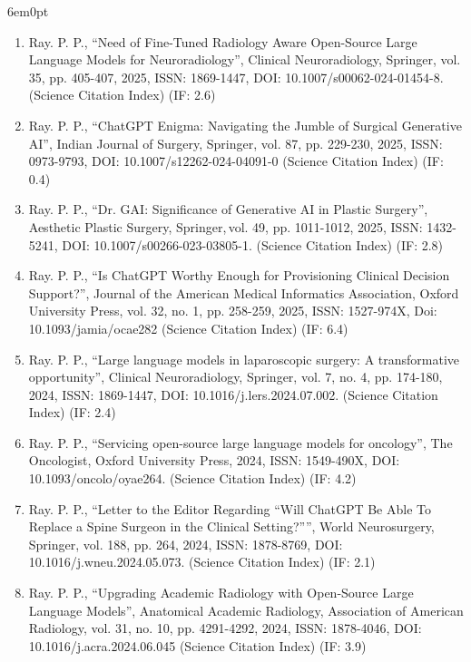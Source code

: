 \documentclass[11pt,a4paper]{moderncv}
\begin{document}
\begin{adjustwidth}{6em}{0pt}
\begin{enumerate}
		\item Ray. P. P., “Need of Fine-Tuned Radiology Aware Open-Source Large Language Models for Neuroradiology”, Clinical Neuroradiology, Springer, vol. 35, pp. 405-407, 2025, ISSN: 1869-1447, DOI: 10.1007/s00062-024-01454-8. (Science Citation Index) (IF: 2.6)
		
		\item Ray. P. P., “ChatGPT Enigma: Navigating the Jumble of Surgical Generative AI”, Indian Journal of Surgery, Springer, vol. 87, pp. 229-230, 2025, ISSN: 0973-9793, DOI: 10.1007/s12262-024-04091-0 (Science Citation Index) (IF: 0.4)
		
		\item Ray. P. P., “Dr. GAI: Significance of Generative AI in Plastic Surgery”, Aesthetic Plastic Surgery, Springer, vol. 49, pp. 1011-1012, 2025, ISSN: 1432-5241, DOI: 10.1007/s00266-023-03805-1. (Science Citation Index) (IF: 2.8)
		
		\item Ray. P. P., “Is ChatGPT Worthy Enough for Provisioning Clinical Decision Support?”, Journal of the American Medical Informatics Association, Oxford University Press, vol. 32, no. 1, pp. 258-259, 2025, ISSN: 1527-974X, Doi: 10.1093/jamia/ocae282 (Science Citation Index) (IF: 6.4)
		
		\item Ray. P. P., “Large language models in laparoscopic surgery: A transformative opportunity”, Clinical Neuroradiology, Springer, vol. 7, no. 4, pp. 174-180, 2024, ISSN: 1869-1447, DOI: 10.1016/j.lers.2024.07.002. (Science Citation Index) (IF: 2.4)
		
		\item Ray. P. P., “Servicing open-source large language models for oncology”, The Oncologist, Oxford University Press, 2024, ISSN: 1549-490X, DOI: 10.1093/oncolo/oyae264. (Science Citation Index) (IF: 4.2)
		
		\item Ray. P. P., “Letter to the Editor Regarding “Will ChatGPT Be Able To Replace a Spine Surgeon in the Clinical Setting?””, World Neurosurgery, Springer, vol. 188, pp. 264, 2024, ISSN: 1878-8769, DOI: 10.1016/j.wneu.2024.05.073. (Science Citation Index) (IF: 2.1)
		
		\item Ray. P. P., “Upgrading Academic Radiology with Open-Source Large Language Models”, Anatomical Academic Radiology, Association of American Radiology, vol. 31, no. 10, pp. 4291-4292, 2024, ISSN: 1878-4046, DOI: 10.1016/j.acra.2024.06.045 (Science Citation Index) (IF: 3.9)
		

\end{enumerate}
\end{adjustwidth}
\end{document}
